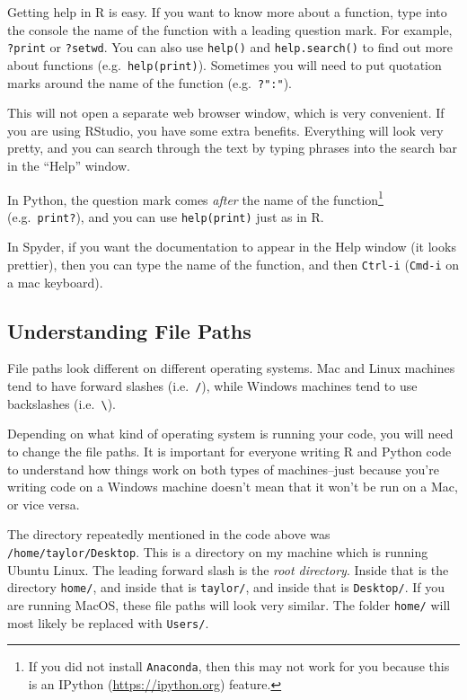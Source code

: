 \documentclass[
  12pt,
]{krantz}
\begin{document}
Getting help in R is easy. If you want to know more about a function, type into the console the name of the function with a leading question mark. For example, \texttt{?print} or \texttt{?setwd}. You can also use \texttt{help()} and \texttt{help.search()} to find out more about functions (e.g.~\texttt{help(print)}). Sometimes you will need to put quotation marks around the name of the function (e.g.~\texttt{?":"}).

This will not open a separate web browser window, which is very convenient. If you are using RStudio, you have some extra benefits. Everything will look very pretty, and you can search through the text by typing phrases into the search bar in the ``Help'' window.

In Python, the question mark comes \emph{after} the name of the function\footnote{If you did not install \texttt{Anaconda}, then this may not work for you because this is an IPython (\url{https://ipython.org}) feature.} (e.g.~\texttt{print?}), and you can use \texttt{help(print)} just as in R.

In Spyder, if you want the documentation to appear in the Help window (it looks prettier), then you can type the name of the function, and then \texttt{Ctrl-i} (\texttt{Cmd-i} on a mac keyboard).

\hypertarget{understanding-file-paths}{%
\subsection{Understanding File Paths}\label{understanding-file-paths}}

File paths look different on different operating systems. Mac and Linux machines tend to have forward slashes (i.e.~\texttt{/}), while Windows machines tend to use backslashes (i.e.~\texttt{\textbackslash{}}).

Depending on what kind of operating system is running your code, you will need to change the file paths. It is important for everyone writing R and Python code to understand how things work on both types of machines--just because you're writing code on a Windows machine doesn't mean that it won't be run on a Mac, or vice versa.

The directory repeatedly mentioned in the code above was \texttt{/home/taylor/Desktop}. This is a directory on my machine which is running Ubuntu Linux. The leading forward slash is the \emph{root directory}. Inside that is the directory \texttt{home/}, and inside that is \texttt{taylor/}, and inside that is \texttt{Desktop/}. If you are running MacOS, these file paths will look very similar. The folder \texttt{home/} will most likely be replaced with \texttt{Users/}.
\end{document}
